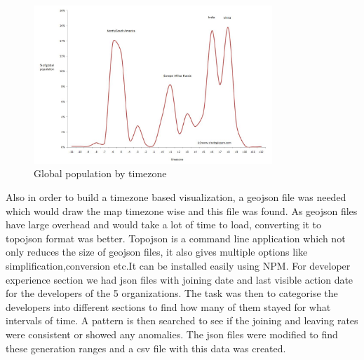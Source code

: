\documentclass[double,12pt]{beavtex}
\begin{document}
\begin{figure}[!ht]
\centering
\includegraphics[width=90mm]{pop1.jpg}
\caption{Global population by timezone}
\end{figure}

Also in order to build a timezone based visualization, a geojson file was needed which would draw the map timezone wise and this file was found. As geojson files have large overhead and would take a lot of time to load, converting it to topojson format was better. Topojson is a command line application which not only reduces the size of geojson files, it also gives multiple options like simplification,conversion etc.It can be installed easily using NPM. For developer experience section we had json files with joining date and last visible action date for the developers of the 5 organizations. The task was then to categorise the developers into different sections to find how many of them stayed for what intervals of time. A pattern is then searched to see if the joining and leaving rates were consistent or showed any anomalies. The json files were modified to find these generation ranges and a csv file with this data was created.
\end{document}
